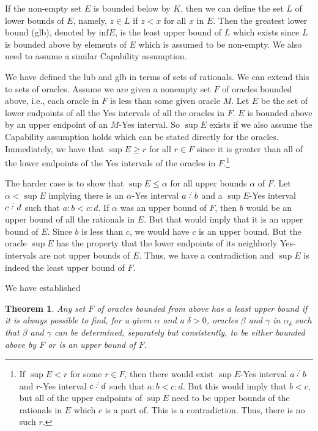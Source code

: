 \documentclass[12pt]{article}
\newtheorem{theorem}{Theorem}[subsection]
\begin{document}
If the non-empty set $E$ is bounded below by $K$, then we can define the set $L$ of lower bounds of $E$, namely, $z \in L$ if $z < x$ for all $x$ in $E$. Then the greatest lower bound (glb), denoted by $\mathrm{inf} E$, is the least upper bound of $L$ which exists since $L$ is bounded above by elements of $E$ which is assumed to be non-empty. We also need to assume  a similar Capability assumption. 

We have defined the lub and glb in terms of sets of rationals. We can extend this to sets of oracles. Assume we are given a nonempty set $F$ of oracles bounded above, i.e., each oracle in $F$ is less than some given oracle $M$. Let $E$ be the set of lower endpoints of all the Yes intervals of all the oracles in $F$. $E$ is bounded above by an upper endpoint of an $M$-Yes interval. So $\sup E$ exists if we also assume the Capability assumption holds which can be stated directly for the oracles. Immediately, we have that $\sup E \geq r$ for all $r \in F$ since it is greater than all of the lower endpoints of the Yes intervals of the oracles in $F$.\footnote{If $\sup E < r$ for some $r \in F$, then there would exist $\sup E$-Yes interval $a \lte b$ and $r$-Yes interval $c\lte d$ such that $a:b < c:d$. But this would imply that $b < c$, but all of the upper endpoints of $\sup E$ need to be upper bounds of the rationals in $E$ which $c$ is a part of. This is a contradiction. Thus, there is no such $r$.}

The harder case is to show that $\sup E \leq \alpha$ for all upper bounds $\alpha$ of $F$. Let $\alpha < \sup E$ implying there is an $\alpha$-Yes interval $a\lte b$ and a $\sup E$-Yes interval $c\lte d$ such that $a:b < c:d$. If $\alpha$ was an upper bound of $F$, then $b$ would be an upper bound of all the rationals in $E$. But that would imply that it is an upper bound of $E$. Since $b$ is less than $c$, we would have $c$ is an upper bound. But the oracle $\sup E$ has the property that the lower endpoints of its neighborly Yes-intervals are not upper bounds of $E$. Thus, we have a contradiction and $\sup E$ is indeed the least upper bound of $F$.

We have established

\begin{theorem}\label{th:lub}
Any set $F$ of oracles bounded from above has a least upper bound if it is always possible to find, for a given $\alpha$ and a $\delta > 0$, oracles $\beta$ and $\gamma$ in $\alpha_\delta$ such that $\beta$ and $\gamma$ can be determined, separately but consistently, to be either bounded above by $F$ or is an upper bound of $F$. 
\end{theorem}
\end{document}
